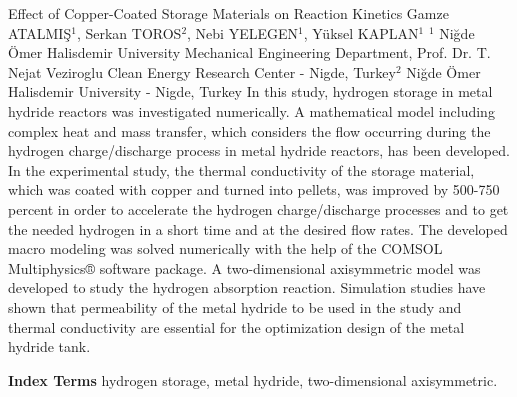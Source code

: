 
    \begin{abstract_online}{Effect of Copper-Coated Storage Materials on Reaction Kinetics}{%
        Gamze ATALMIŞ$^{1}$, Serkan TOROS$^{2}$, Nebi YELEGEN$^{1}$, Yüksel KAPLAN$^{1}$}{%
        }{%
        $^1$ Niğde Ömer Halisdemir University Mechanical Engineering Department, Prof. Dr. T. Nejat Veziroglu Clean Energy Research Center - Nigde, Turkey\newline{}$^2$ Niğde Ömer Halisdemir University - Nigde, Turkey}
    In this study, hydrogen storage in metal hydride reactors was investigated numerically. A mathematical model including complex heat and mass transfer, which considers the flow occurring during the hydrogen charge/discharge process in metal hydride reactors, has been developed. In the experimental study, the thermal conductivity of the storage material, which was coated with copper and turned into pellets, was improved by 500-750 percent in order to accelerate the hydrogen charge/discharge processes and to get the needed hydrogen in a short time and at the desired flow rates. The developed macro modeling was solved numerically with the help of the COMSOL Multiphysics® software package. A two-dimensional axisymmetric model was developed to study the hydrogen absorption reaction. Simulation studies have shown that permeability of the metal hydride to be used in the study and thermal conductivity are essential for the optimization design of the metal hydride tank. 
    
            \textbf{Index Terms} \newline{}hydrogen storage, metal hydride, two-dimensional axisymmetric.
    \end{abstract_online}
    